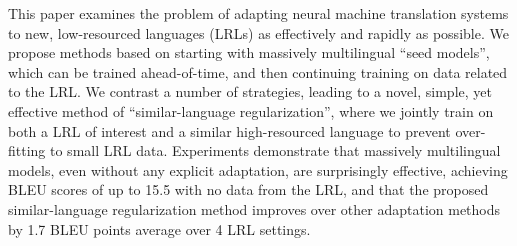 This paper examines the problem of adapting neural machine translation systems to new, low-resourced languages (LRLs) as effectively and rapidly as possible. We propose methods based on starting with massively multilingual ``seed models'', which can be trained ahead-of-time, and then continuing training on data related to the LRL. We contrast a number of strategies, leading to a novel, simple, yet effective method of ``similar-language regularization'', where we jointly train on both a LRL of interest and a similar high-resourced language to prevent over-fitting to small LRL data. Experiments demonstrate that massively multilingual models, even without any explicit adaptation, are surprisingly effective, achieving BLEU scores of up to 15.5 with no data from the LRL, and that the proposed similar-language regularization method improves over other adaptation methods by 1.7 BLEU points average over 4 LRL settings.

